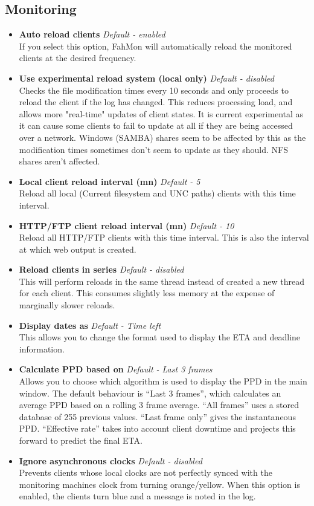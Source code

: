 \subsection{Monitoring}
\begin{itemize}
 \item \textbf{Auto reload clients} \textit{Default - enabled}
  \\If you select this option, FahMon will automatically reload the monitored
   clients at the desired frequency.
 \item \textbf{Use experimental reload system (local only)} \textit{Default -
  disabled}
  \\Checks the file modification times every 10 seconds and only proceeds to
   reload the client if the log has changed. This reduces processing load, and
   allows more "real-time" updates of client states. It is current experimental
   as it can cause some clients to fail to update at all if they are being
   accessed over a network. Windows (SAMBA) shares seem to be affected by this
   as the modification times sometimes don't seem to update as they should. NFS
   shares aren't affected.
 \item   \textbf{Local client reload interval (mn)} \textit{Default - 5}
  \\Reload all local (Current filesystem and UNC paths) clients with this time
   interval.
 \item   \textbf{HTTP/FTP client reload interval (mn)} \textit{Default - 10}
  \\Reload all HTTP/FTP clients with this time interval. This is also the
   interval at which web output is created.
 \item \textbf{Reload clients in series} \textit{Default - disabled}
  \\This will perform reloads in the same thread instead of created a new thread
   for each client. This consumes slightly less memory at the expense of
   marginally slower reloads.
 \item   \textbf{Display dates as} \textit{Default - Time left}
  \\This allows you to change the format used to display the ETA and deadline
   information.
 \item   \textbf{Calculate PPD based on} \textit{Default - Last 3 frames}
  \\Allows you to choose which algorithm is used to display the PPD in the main
   window. The default behaviour is ``Last 3 frames'', which calculates an
   average PPD based on a rolling 3 frame average. ``All frames'' uses a stored
   database of 255 previous values. ``Last frame only'' gives the instantaneous
   PPD. ``Effective rate'' takes into account client downtime and projects this
   forward to predict the final ETA.
 \item   \textbf{Ignore asynchronous clocks} \textit{Default - disabled}
  \\Prevents clients whose local clocks are not perfectly synced with the
   monitoring machines clock from turning orange/yellow. When this option is
   enabled, the clients turn blue and a message is noted in the log.
\end{itemize}

